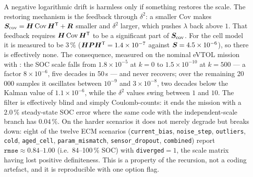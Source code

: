 A negative logarithmic drift is harmless only if something restores the scale.  The restoring
mechanism is the feedback through $\delta^2$: a smaller $\mathrm{Cov}$ makes
$\bm{S}_{\mathrm{cov}}=\bm{H}\,\mathrm{Cov}\,\bm{H}^{\mathsf{T}}+\bm{R}$ smaller and $\delta^2$ larger, which pushes
$\lambda$ back above $1$.  That feedback requires $\bm{H}\,\mathrm{Cov}\,\bm{H}^{\mathsf{T}}$ to be a significant
part of $\bm{S}_{\mathrm{cov}}$.  For the cell model it is measured to be $3\,\%$
($\bm{H}\bm{P}\bm{H}^{\mathsf{T}}=1.4\times10^{-7}$ against $\bm{S}=4.5\times10^{-6}$), so there is effectively none.
The consequence, measured on the nominal eVTOL mission with :
the SOC scale falls from $1.8\times10^{-5}$ at $k=0$ to $1.5\times10^{-10}$ at $k=500$ --- a factor
$8\times10^{-6}$, five decades in 50\,s --- and never recovers; over the remaining
20\,000 samples it oscillates between $10^{-9}$ and $3\times10^{-8}$, two decades below the
Kalman value of $1.1\times10^{-6}$, while the $\delta^2$ values swing between $1$ and $10$.  The
filter is effectively blind and simply Coulomb-counts: it ends the mission with a $2.0\,\%$
steady-state SOC error where the same code with the independent-scale branch has $0.04\,\%$.  On
the harder scenarios it does not merely degrade but breaks down: eight of the twelve ECM scenarios
(\texttt{current\_bias}, \texttt{noise\_step}, \texttt{outliers}, \texttt{cold},
\texttt{aged\_cell}, \texttt{param\_mismatch}, \texttt{sensor\_dropout}, \texttt{combined}) report
$\texttt{rmse}\approx0.84$--$1.00$ (i.e.\ 84--100\,\% SOC) with \texttt{diverged}$=1$, the scale
matrix having lost positive definiteness.  This is a property of the recursion, not a coding
artefact, and it is reproducible with one option flag.

